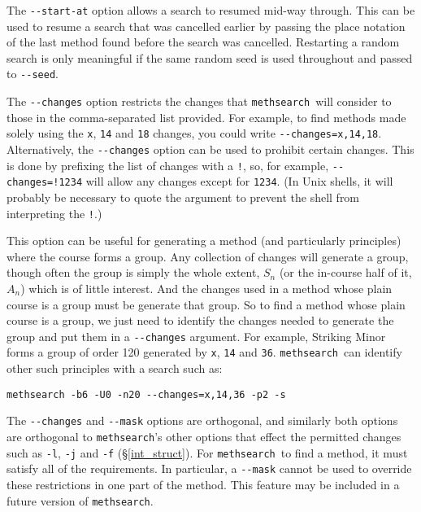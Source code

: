 \documentclass[a4paper,11pt,oneside]{book}
\makeatletter
\newcommand{\loid}[1]{\index{#1@{\hspace*{-\loptwidth}\texttt{--#1}}|ulink}}
\def\methsearch{\texttt{meth\-search}}
\newcommand{\sref}[1]{\hyperref[#1]{\S\ref{#1}}}
\makeatother
\begin{document}
The \verb+--start-at+ option\loid{start-at} allows a search to resumed 
mid-way through.  This can be used to resume a search that was cancelled 
earlier by passing the place notation of the last method found before the 
search was cancelled.  Restarting a random search
is only meaningful if the same random seed is used throughout and passed
to \verb+--seed+.

The \verb+--changes+ option\loid{changes} restricts the changes that
\methsearch\ will consider to those in the comma-separated list provided.  
For example, to find methods made solely using the \verb+x+, \verb+14+ and
\verb+18+ changes, you could write \verb+--changes=x,14,18+.  
Alternatively, the \verb+--changes+ option can be used to prohibit certain 
changes.  This is done by prefixing the list of changes with a \verb+!+,
so, for example, \verb+--changes=!1234+ will allow any changes except for
\verb+1234+.  (In Unix shells, it will probably be necessary to quote the
argument to prevent the shell from interpreting the \verb+!+.)

This option can be useful for generating a method (and particularly principles)
where the course forms a group.  Any collection of changes 
will generate a group, though often the group is simply the whole extent,
$S_n$ (or the in-course half of it, $A_n$) which is of little interest.
And the changes used in a method whose plain course is a group must be 
generate that group.  So to find a method whose plain course is a group,
we just need to identify the changes needed to generate the group and put
them in a \verb+--changes+ argument.  
For example, Striking Minor forms a group of order 120 
generated by \verb+x+, \verb+14+ and \verb+36+.  \methsearch\ can
identify other such principles with a search such as:

\begin{Verbatim}
methsearch -b6 -U0 -n20 --changes=x,14,36 -p2 -s
\end{Verbatim}

The \verb+--changes+ and \verb+--mask+ options are orthogonal, and similarly
both options are orthogonal to \methsearch's other options that effect the
permitted changes such as \verb+-l+, \verb+-j+ and \verb+-f+ 
(\sref{int_struct}).  For \methsearch\ to find a method, it must satisfy all
of the requirements.  In particular, a \verb+--mask+ cannot be used to 
override these restrictions in one part of the method.  This feature
may be included in a future version of \methsearch.
\end{document}
